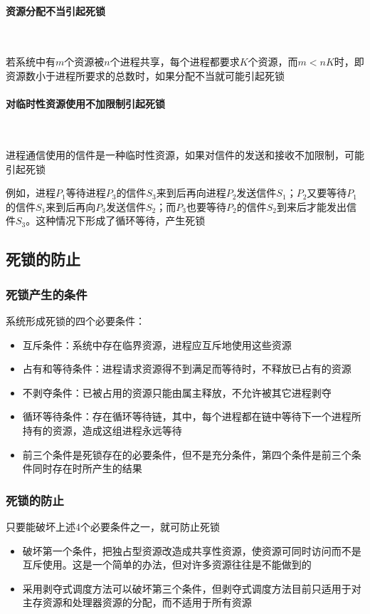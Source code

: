 \documentclass[cs4size,a4paper,10pt]{ctexart}
\begin{document}
	\paragraph{资源分配不当引起死锁}~{}

	若系统中有$m$个资源被$n$个进程共享，每个进程都要求$K$个资源，而$m<nK$时，即资源数小于进程所要求的总数时，如果分配不当就可能引起死锁

	\paragraph{对临时性资源使用不加限制引起死锁}~{}

	进程通信使用的信件是一种临时性资源，如果对信件的发送和接收不加限制，可能引起死锁

	例如，进程$P_1$等待进程$P_3$的信件$S_3$来到后再向进程$P_2$发送信件$S_1$；$P_2$又要等待$P_1$的信件$S_1$来到后再向$P_3$发送信件$S_2$；而$P_3$也要等待$P_2$的信件$S_2$到来后才能发出信件$S_3$。这种情况下形成了循环等待，产生死锁

	\subsection{死锁的防止}

	\subsubsection{死锁产生的条件}
	系统形成死锁的四个必要条件：
	\begin{itemize}
		\item 互斥条件：系统中存在临界资源，进程应互斥地使用这些资源
		\item 占有和等待条件：进程请求资源得不到满足而等待时，不释放已占有的资源
		\item 不剥夺条件：已被占用的资源只能由属主释放，不允许被其它进程剥夺
		\item 循环等待条件：存在循环等待链，其中，每个进程都在链中等待下一个进程所持有的资源，造成这组进程永远等待
		\item 前三个条件是死锁存在的必要条件，但不是充分条件，第四个条件是前三个条件同时存在时所产生的结果
	\end{itemize}

	\subsubsection{死锁的防止}
	只要能破坏上述4个必要条件之一，就可防止死锁
	\begin{itemize}
		\item 破坏第一个条件，把独占型资源改造成共享性资源，使资源可同时访问而不是互斥使用。这是一个简单的办法，但对许多资源往往是不能做到的
		\item 采用剥夺式调度方法可以破坏第三个条件，但剥夺式调度方法目前只适用于对主存资源和处理器资源的分配，而不适用于所有资源
	\end{itemize}
\end{document}

